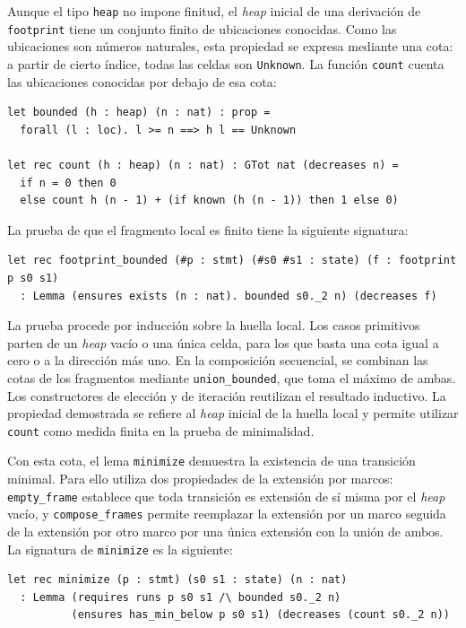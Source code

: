 \documentclass[a4paper,	11pt]{report}
\begin{document}
Aunque el tipo \lstinline|heap| no impone finitud,
el \emph{heap} inicial de una derivación de \lstinline|footprint| tiene un conjunto finito de ubicaciones conocidas.
Como las ubicaciones son números naturales,
esta propiedad se expresa mediante una cota:
a partir de cierto índice,
todas las celdas son \lstinline|Unknown|.
La función \lstinline|count| cuenta las ubicaciones conocidas por debajo de esa cota:

\begin{lstlisting}
let bounded (h : heap) (n : nat) : prop =
  forall (l : loc). l >= n ==> h l == Unknown

let rec count (h : heap) (n : nat) : GTot nat (decreases n) =
  if n = 0 then 0
  else count h (n - 1) + (if known (h (n - 1)) then 1 else 0)
\end{lstlisting}

La prueba de que el fragmento local es finito tiene la siguiente signatura:

\begin{lstlisting}
let rec footprint_bounded (#p : stmt) (#s0 #s1 : state) (f : footprint p s0 s1)
  : Lemma (ensures exists (n : nat). bounded s0._2 n) (decreases f)
\end{lstlisting}
La prueba procede por inducción sobre la huella local.
Los casos primitivos parten de un \emph{heap} vacío o una única celda,
para los que basta una cota igual a cero o a la dirección más uno.
En la composición secuencial,
se combinan las cotas de los fragmentos mediante \lstinline|union_bounded|,
que toma el máximo de ambas.
Los constructores de elección y de iteración reutilizan el resultado inductivo.
La propiedad demostrada se refiere al \emph{heap} inicial de la huella local y permite utilizar \lstinline|count| como medida finita en la prueba de minimalidad.

Con esta cota,
el lema \lstinline|minimize| demuestra la existencia de una transición minimal.
Para ello utiliza dos propiedades de la extensión por marcos:
\lstinline|empty_frame| establece que toda transición es extensión de sí misma por el \emph{heap} vacío,
y \lstinline|compose_frames| permite reemplazar la extensión por un marco seguida de la extensión por otro marco por una única extensión con la unión de ambos.
La signatura de \lstinline|minimize| es la siguiente:

\begin{lstlisting}
let rec minimize (p : stmt) (s0 s1 : state) (n : nat)
  : Lemma (requires runs p s0 s1 /\ bounded s0._2 n)
          (ensures has_min_below p s0 s1) (decreases (count s0._2 n))
\end{lstlisting}
\end{document}

